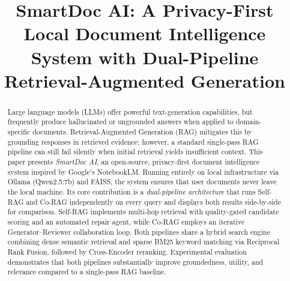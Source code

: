 \documentclass[10pt, conference, a4paper, compsocconf]{IEEEtran}
\begin{document}
\fontsize{10}{12}
\selectfont
\sloppy
\setlength{\emergencystretch}{3em}



\title{SmartDoc AI: A Privacy-First Local Document Intelligence System
       with Dual-Pipeline Retrieval-Augmented Generation}

\author{
}

\maketitle


\begin{abstract}
Large language models (LLMs) offer powerful text-generation capabilities,
but frequently produce hallucinated or ungrounded answers when applied to
domain-specific documents. Retrieval-Augmented Generation (RAG) mitigates
this by grounding responses in retrieved evidence; however, a standard
single-pass RAG pipeline can still fail silently when initial retrieval
yields insufficient context. This paper presents \emph{SmartDoc AI}, an
open-source, privacy-first document intelligence system inspired by Google's
NotebookLM. Running entirely on local infrastructure via Ollama
(Qwen2.5:7b) and FAISS, the system ensures that user documents never leave
the local machine. Its core contribution is a \emph{dual-pipeline
architecture} that runs Self-RAG and Co-RAG independently on every query
and displays both results side-by-side for comparison. Self-RAG implements
multi-hop retrieval with quality-gated candidate scoring and an automated
repair agent, while Co-RAG employs an iterative Generator--Reviewer
collaboration loop. Both pipelines share a hybrid search engine combining
dense semantic retrieval and sparse BM25 keyword matching via Reciprocal
Rank Fusion, followed by Cross-Encoder reranking. Experimental evaluation
demonstrates that both pipelines substantially improve groundedness,
utility, and relevance compared to a single-pass RAG baseline.
\end{abstract}
\end{document}
